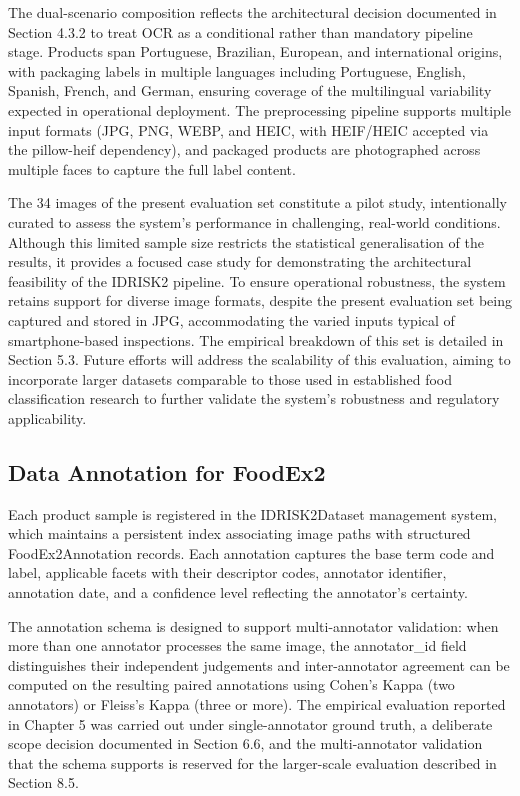The dual-scenario composition reflects the architectural decision documented in Section 4.3.2 to treat OCR as a conditional rather than mandatory pipeline stage. Products span Portuguese, Brazilian, European, and international origins, with packaging labels in multiple languages including Portuguese, English, Spanish, French, and German, ensuring coverage of the multilingual variability expected in operational deployment. The preprocessing pipeline supports multiple input formats (JPG, PNG, WEBP, and HEIC, with HEIF/HEIC accepted via the pillow-heif dependency), and packaged products are photographed across multiple faces to capture the full label content.

The 34 images of the present evaluation set constitute a pilot study, intentionally curated to assess the system's performance in challenging, real-world conditions. Although this limited sample size restricts the statistical generalisation of the results, it provides a focused case study for demonstrating the architectural feasibility of the IDRISK2 pipeline. To ensure operational robustness, the system retains support for diverse image formats, despite the present evaluation set being captured and stored in JPG, accommodating the varied inputs typical of smartphone-based inspections. The empirical breakdown of this set is detailed in Section 5.3. Future efforts will address the scalability of this evaluation, aiming to incorporate larger datasets comparable to those used in established food classification research to further validate the system's robustness and regulatory applicability.

\hypertarget{data-annotation-for-foodex2}{%
\subsection{Data Annotation for FoodEx2}\label{data-annotation-for-foodex2}}

Each product sample is registered in the IDRISK2Dataset management system, which maintains a persistent index associating image paths with structured FoodEx2Annotation records. Each annotation captures the base term code and label, applicable facets with their descriptor codes, annotator identifier, annotation date, and a confidence level reflecting the annotator's certainty.

The annotation schema is designed to support multi-annotator validation: when more than one annotator processes the same image, the annotator\_id field distinguishes their independent judgements and inter-annotator agreement can be computed on the resulting paired annotations using Cohen's Kappa (two annotators) or Fleiss's Kappa (three or more). The empirical evaluation reported in Chapter 5 was carried out under single-annotator ground truth, a deliberate scope decision documented in Section 6.6, and the multi-annotator validation that the schema supports is reserved for the larger-scale evaluation described in Section 8.5.

